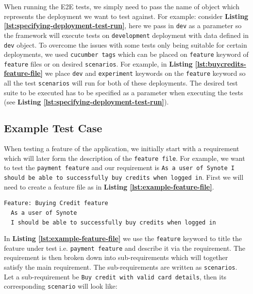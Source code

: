 When running the E2E tests, we simply need to pass the name of object which represents the deployment we want to test against. For example: consider \textbf{Listing \ref{lst:specifying-deployment-test-run}}, here we pass in \texttt{dev} as a parameter so the framework will execute tests on \texttt{development} deployment with data defined in \texttt{dev} object.  To overcome the issues with some tests only being suitable for certain deployments, we used \texttt{cucumber tags} which can be placed on \texttt{feature} keyword of \texttt{feature} files or on desired \texttt{scenarios}. For example, in \textbf{Listing \ref{lst:buycredits-feature-file}} we place \texttt{dev} and \texttt{experiment} keywords on the \texttt{feature} keyword so all the test \texttt{scenarios} will run for both of these deployments. The desired test suite to be executed has to be specified as a parameter when executing the tests (see \textbf{Listing \ref{lst:specifying-deployment-test-run}}).

\subsection{Example Test Case}
\label{subsec:example-test-case}

When testing a feature of the application, we initially start with a requirement which will later form the description of the \texttt{feature file}. For example, we want to test the \texttt{payment feature} and our requirement is \texttt{As a user of Synote I should be able to successfully buy credits when logged in}. First we will need to create a feature file as in \textbf{Listing \ref{lst:example-feature-file}}.

\begin{listing}[H]
\begin{verbatim}
Feature: Buying Credit feature
  As a user of Synote
  I should be able to successfully buy credits when logged in
\end{verbatim}
\label{lst:example-feature-file}
\end{listing}

In \textbf{Listing \ref{lst:example-feature-file}} we use the \texttt{feature} keyword to title the feature under test i.e. \texttt{payment feature} and describe it via the requirement. The requirement is then broken down into sub-requirements which will together satisfy the main requirement. The sub-requirements are written as \texttt{scenarios}. Let a sub-requirement be \texttt{Buy credit with valid card details}, then its corresponding \texttt{scenario} will look like:

